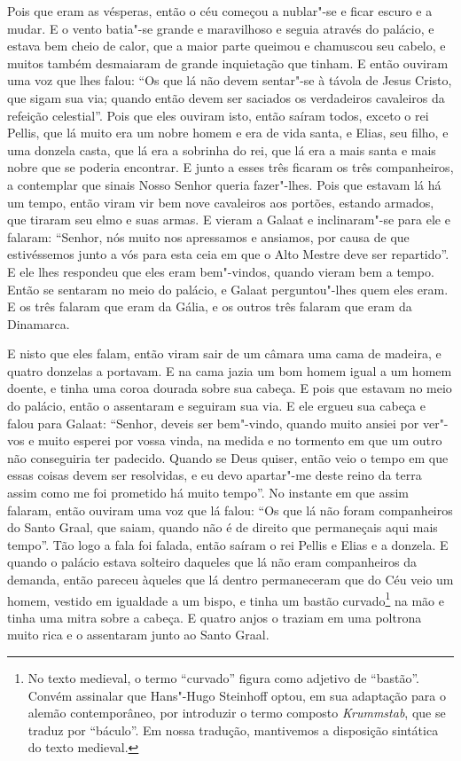  Pois que eram as vésperas, então o céu começou a nublar"-se e ficar escuro e a
mudar. E o vento batia"-se grande e maravilhoso e seguia através do palácio, e
estava bem cheio de calor, que a maior parte queimou e chamuscou seu cabelo, e
muitos também desmaiaram de grande inquietação que tinham. E então ouviram uma
voz que lhes falou: “Os que lá não devem sentar"-se à távola de Jesus Cristo,
que sigam sua via; quando então devem ser saciados os verdadeiros cavaleiros da
refeição celestial”. Pois que eles ouviram isto, então saíram todos,
exceto o rei Pellis, que lá muito era um nobre homem e era de vida santa, e
Elias, seu filho, e uma donzela casta, que lá era a sobrinha do rei, que lá era
a mais santa e mais nobre que se poderia encontrar. E junto a esses três
ficaram os três companheiros, a contemplar que sinais Nosso Senhor queria
fazer"-lhes. Pois que estavam lá há um tempo, então viram vir bem nove
cavaleiros aos portões, estando armados, que tiraram seu elmo e suas armas. E
vieram a Galaat e inclinaram"-se para ele e falaram: “Senhor, nós muito nos
apressamos e ansiamos, por causa de que estivéssemos junto a vós para esta ceia
em que o Alto Mestre deve ser repartido”. E ele lhes respondeu que eles eram
bem"-vindos, quando vieram bem a tempo. Então se sentaram no meio do palácio, e
Galaat perguntou"-lhes quem eles eram. E os três falaram que eram da Gália, e os
outros três falaram que eram da Dinamarca. 

E nisto que eles falam, então viram sair de um câmara uma cama de madeira, e
quatro donzelas a portavam. E na cama jazia um bom homem igual a um homem
doente, e tinha uma coroa dourada sobre sua cabeça. E pois que estavam no meio
do palácio,  então o assentaram e seguiram sua via. E ele ergueu sua cabeça e
falou para Galaat: “Senhor, deveis ser bem"-vindo, quando muito ansiei por
ver"-vos e muito esperei por vossa vinda, na medida e no tormento em que um
outro não conseguiria ter padecido. Quando se Deus quiser, então veio o tempo
em que essas coisas devem ser resolvidas, e eu devo apartar"-me deste reino da
terra assim como me foi prometido há muito tempo”. No instante em que assim
falaram, então ouviram uma voz que lá falou: “Os que lá não foram companheiros
do Santo Graal, que saiam, quando não é de direito que permaneçais aqui mais
tempo”. Tão logo a fala foi falada, então saíram o rei Pellis e Elias
e a donzela. E quando o palácio estava solteiro daqueles que lá não eram
companheiros da demanda, então pareceu àqueles que lá dentro permaneceram que
do Céu veio um homem, vestido em igualdade a um bispo, e tinha um bastão
curvado\footnote{No texto medieval, o termo “curvado”  
figura como adjetivo de “bastão”. Convém assinalar que
Hans"-Hugo Steinhoff optou, em sua adaptação para o alemão contemporâneo, por
introduzir o termo composto \textit{Krummstab}, que se traduz por “báculo”. Em
nossa tradução, mantivemos a disposição sintática do texto medieval.} 
na mão e tinha uma mitra sobre a cabeça. E quatro anjos o traziam em uma
poltrona muito rica e o assentaram junto ao Santo Graal. 

